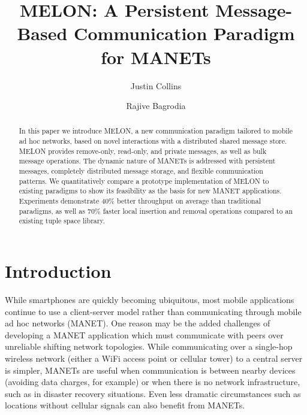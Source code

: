 \documentclass[lnicst]{svmultln}
\begin{document}
\mainmatter  %

\title{MELON: A Persistent Message-Based Communication Paradigm for MANETs}


\author{Justin Collins\and Rajive Bagrodia}




\maketitle
\begin{abstract}
In this paper we introduce MELON, a new communication paradigm tailored to mobile ad hoc networks, based on novel interactions with a distributed shared message store. MELON provides remove-only, read-only, and private messages, as well as bulk message operations. The dynamic nature of MANETs is addressed with persistent messages, completely distributed message storage, and flexible communication patterns. We quantitatively compare a prototype implementation of MELON to existing paradigms to show its feasibility as the basis for new MANET applications. Experiments demonstrate 40\% better throughput on average than traditional paradigms, as well as 70\% faster local insertion and removal operations compared to an existing tuple space library.
\end{abstract}

\section{Introduction}

While smartphones are quickly becoming ubiquitous, most mobile applications continue to use a client-server model rather than communicating through mobile ad hoc networks (MANET). One reason may be the added challenges of developing a MANET application which must communicate with peers over unreliable shifting network topologies. While communicating over a single-hop wireless network (either a WiFi access point or cellular tower) to a central server is simpler, MANETs are useful when communication is between nearby devices (avoiding data charges, for example) or when there is no network infrastructure, such as in disaster recovery situations. Even less dramatic circumstances such as locations without cellular signals can also benefit from MANETs.
\end{document}
